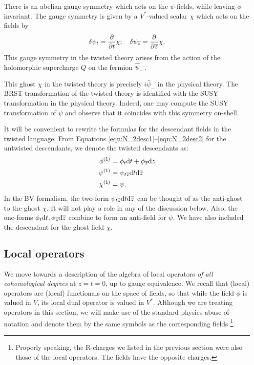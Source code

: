 \documentclass[11pt]{amsart}
\begin{document}
There is an abelian gauge symmetry which acts on the $\psi$-fields, while leaving $\phi$ invariant.
The gauge symmetry is given by a $V^*$-valued scalar $\chi$ which acts on the fields by
\begin{equation}\label{eqn:freegauge}
\delta \psi_t = \frac{\partial}{\partial t} \chi; \quad
\delta \psi_\zbar = \frac{\partial}{\partial \zbar} \chi .
\end{equation}
This gauge symmetry in the twisted theory arises from the action of the holomorphic supercharge $Q$ on the fermion $\Bar{\psi}_-$. 

This ghost $\chi$ in the twisted theory is precisely $i \bar{\psi}_-$ in the physical theory. The BRST transformation of the twisted theory is identified with the SUSY transformation in the physical theory. Indeed, one may compute the SUSY transformation of $\psi$ and observe that it coincides with this symmetry on-shell.

It will be convenient to rewrite the formulas for the descendant fields in the twisted language. 
From Equations \eqref{eqn:N=2desc1}--\eqref{eqn:N=2desc2} for the untwisted descendants, we denote the twisted descendants as:
\begin{align}
\label{eqn:N=2desc1tw}
\phi^{(1)} &= \phi_t \d t + \phi_{\zbar} \d \bar{z} \\
\label{eqn:N=2desc2tw}
\psi^{(1)} &= \psi_{t \zbar} \d t \d \zbar  \\
\label{eqn:N=2desc3tw} 
\chi^{(1)} &= \psi .
\end{align}
In the BV formalism, the two-form $\psi_{t \zbar} \d t \d \zbar$ can be thought of as the anti-ghost to the ghost $\chi$. 
It will not play a role in any of the discussion below. 
Also, the one-forms $\phi_t \d t, \phi_{\zbar} \d \zbar$ combine to form an anti-field for $\psi$. 
We have also included the descendant for the ghost field $\chi$.
\subsection{Local operators}

We move towards a description of the algebra of local operators \textit{of all cohomological degrees} at $z = t = 0$, up to gauge equivalence. 
We recall that (local) operators are (local) functionals on the space of fields, so that while the field $\phi$ is valued in $V$, its local dual operator is valued in $V^*$. Although we are treating operators in this section, we will make use of the standard physics abuse of notation and denote them by the same symbols as the corresponding fields \footnote{Properly speaking, the R-charges we listed in the previous section were also those of the local operators. The fields have the opposite charges.}. 
\end{document}
